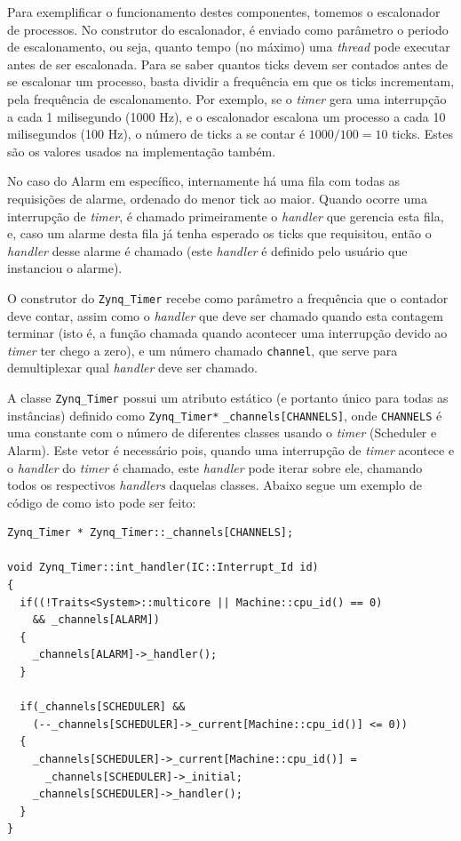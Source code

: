 Para exemplificar o funcionamento destes componentes, tomemos o escalonador de processos. No construtor do escalonador, é enviado como parâmetro o periodo de escalonamento, ou seja, quanto tempo (no máximo) uma \emph{thread} pode executar antes de ser escalonada. Para se saber quantos ticks devem ser contados antes de se escalonar um processo, basta dividir a frequência em que os ticks incrementam, pela frequência de escalonamento. Por exemplo, se o \emph{timer} gera uma interrupção a cada 1 milisegundo (1000 Hz), e o escalonador escalona um processo a cada 10 milisegundos (100 Hz), o número de ticks a se contar é $1000/100 = 10$ ticks. Estes são os valores usados na implementação também.

No caso do Alarm em específico, internamente há uma fila com todas as requisições de alarme, ordenado do menor tick ao maior. Quando ocorre uma interrupção de \emph{timer}, é chamado primeiramente o \emph{handler} que gerencia esta fila, e, caso um alarme desta fila já tenha esperado os ticks que requisitou, então o \emph{handler} desse alarme é chamado (este \emph{handler} é definido pelo usuário que instanciou o alarme).


O construtor do \verb+Zynq_Timer+ recebe como parâmetro a frequência que o contador deve contar, assim como o \emph{handler} que deve ser chamado quando esta contagem terminar (isto é, a função chamada quando acontecer uma interrupção devido ao \emph{timer} ter chego a zero), e um número chamado \verb+channel+, que serve para demultiplexar qual \emph{handler} deve ser chamado.

A classe \verb+Zynq_Timer+ possui um atributo estático (e portanto único para todas as instâncias) definido como \verb+Zynq_Timer*+ \verb+_channels[CHANNELS]+, onde \verb+CHANNELS+ é uma constante com o número de diferentes classes usando o \emph{timer} (Scheduler e Alarm). Este vetor é necessário pois, quando uma interrupção de \emph{timer} acontece e o \emph{handler} do \emph{timer} é chamado, este \emph{handler} pode iterar sobre ele, chamando todos os respectivos \emph{handlers} daquelas classes. Abaixo segue um exemplo de código de como isto pode ser feito:


\label{int_handler}
\begin{lstlisting}
Zynq_Timer * Zynq_Timer::_channels[CHANNELS];

void Zynq_Timer::int_handler(IC::Interrupt_Id id)
{
  if((!Traits<System>::multicore || Machine::cpu_id() == 0)
    && _channels[ALARM])
  {
    _channels[ALARM]->_handler();
  }

  if(_channels[SCHEDULER] &&
    (--_channels[SCHEDULER]->_current[Machine::cpu_id()] <= 0))
  {
    _channels[SCHEDULER]->_current[Machine::cpu_id()] =
      _channels[SCHEDULER]->_initial;
    _channels[SCHEDULER]->_handler();
  }
}
\end{lstlisting}

